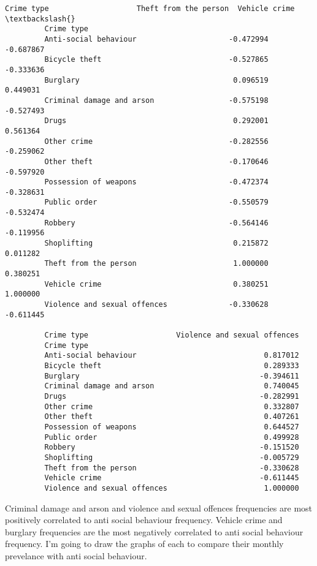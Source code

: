 \documentclass[11pt]{article}
\begin{document}
\begin{Verbatim}[commandchars=\\\{\}]
         Crime type                    Theft from the person  Vehicle crime  \textbackslash{}
         Crime type                                                           
         Anti-social behaviour                     -0.472994      -0.687867   
         Bicycle theft                             -0.527865      -0.333636   
         Burglary                                   0.096519       0.449031   
         Criminal damage and arson                 -0.575198      -0.527493   
         Drugs                                      0.292001       0.561364   
         Other crime                               -0.282556      -0.259062   
         Other theft                               -0.170646      -0.597920   
         Possession of weapons                     -0.472374      -0.328631   
         Public order                              -0.550579      -0.532474   
         Robbery                                   -0.564146      -0.119956   
         Shoplifting                                0.215872       0.011282   
         Theft from the person                      1.000000       0.380251   
         Vehicle crime                              0.380251       1.000000   
         Violence and sexual offences              -0.330628      -0.611445   
         
         Crime type                    Violence and sexual offences  
         Crime type                                                  
         Anti-social behaviour                             0.817012  
         Bicycle theft                                     0.289333  
         Burglary                                         -0.394611  
         Criminal damage and arson                         0.740045  
         Drugs                                            -0.282991  
         Other crime                                       0.332807  
         Other theft                                       0.407261  
         Possession of weapons                             0.644527  
         Public order                                      0.499928  
         Robbery                                          -0.151520  
         Shoplifting                                      -0.005729  
         Theft from the person                            -0.330628  
         Vehicle crime                                    -0.611445  
         Violence and sexual offences                      1.000000  
\end{Verbatim}
            
     Criminal damage and arson and violence and sexual offences frequencies
are most positively correlated to anti social behaviour frequency.
Vehicle crime and burglary frequencies are the most negatively
correlated to anti social behaviour frequency. I'm going to draw the
graphs of each to compare their monthly prevelance with anti social
behaviour. 
\end{document}
